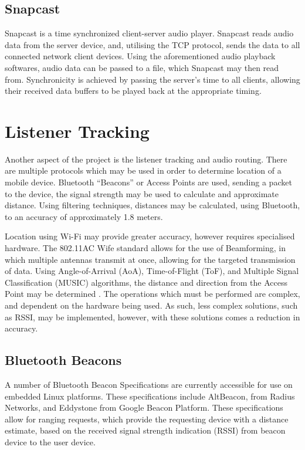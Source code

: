 \documentclass[11pt,a4paper,headinclude=false,footinclude=false]{scrreprt}
\begin{document}
\subsection{Snapcast}\label{snapcast}

Snapcast is a time synchronized client-server audio player. Snapcast
reads audio data from the server device, and, utilising the TCP
protocol, sends the data to all connected network client devices. Using
the aforementioned audio playback softwares, audio data can be passed to
a file, which Snapcast may then read from. Synchronicity is achieved by
passing the server's time to all clients, allowing their received data
buffers to be played back at the appropriate timing.

\section{Listener Tracking}\label{listener-tracking}

Another aspect of the project is the listener tracking and audio
routing. There are multiple protocols which may be used in order to
determine location of a mobile device. Bluetooth ``Beacons'' or Access
Points are used, sending a packet to the device, the signal strength may
be used to calculate and approximate distance\cite{Park15}. Using
filtering techniques, distances may be calculated, using Bluetooth, to
an accuracy of approximately 1.8 meters\cite{Park15}.

Location using Wi-Fi may provide greater accuracy, however requires
specialised hardware\cite{Gjengset14}. The 802.11AC Wife standard allows
for the use of Beamforming, in which multiple antennas transmit at once,
allowing for the targeted transmission of data\cite{Heejung14}. Using
Angle-of-Arrival (AoA), Time-of-Flight (ToF), and Multiple Signal
Classification (MUSIC) algorithms, the distance and direction from the
Access Point may be determined \cite{Afaz18}. The operations which must
be performed are complex, and dependent on the hardware being used. As
such, less complex solutions, such as RSSI, may be implemented, however,
with these solutions comes a reduction in accuracy.

\subsection{Bluetooth Beacons}\label{bluetooth-beacons}

A number of Bluetooth Beacon Specifications are currently accessible for
use on embedded Linux platforms. These specifications include
AltBeacon\cite{altbeacon}, from Radius Networks, and
Eddystone\cite{eddystone} from Google Beacon Platform. These
specifications allow for ranging requests, which provide the requesting
device with a distance estimate, based on the received signal strength
indication (RSSI) from beacon device to the user device.
\end{document}
